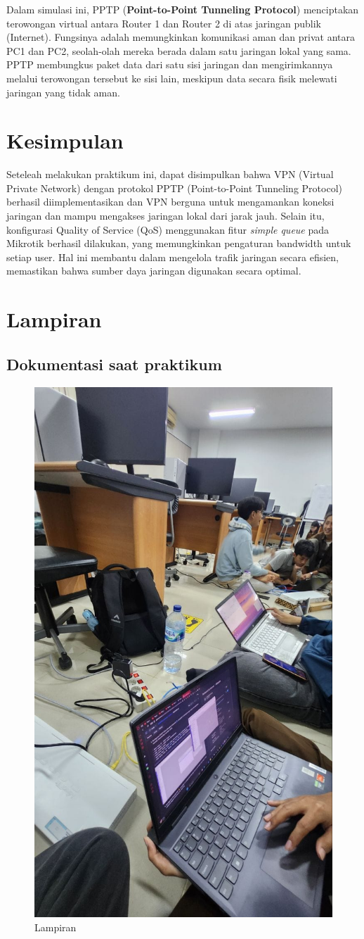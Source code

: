Dalam simulasi ini, PPTP (\textbf{Point-to-Point Tunneling Protocol}) menciptakan terowongan
virtual antara Router 1 dan Router 2 di atas jaringan publik (Internet).
Fungsinya adalah memungkinkan komunikasi aman dan privat antara PC1 dan PC2,
seolah-olah mereka berada dalam satu jaringan lokal yang sama.
PPTP membungkus paket data dari satu sisi jaringan
dan mengirimkannya melalui terowongan tersebut ke sisi lain,
meskipun data secara fisik melewati jaringan yang tidak aman.

\section{Kesimpulan}
Seteleah melakukan praktikum ini, dapat disimpulkan bahwa VPN (Virtual Private Network) dengan protokol PPTP (Point-to-Point Tunneling Protocol) 
berhasil diimplementasikan dan VPN  berguna untuk  mengamankan koneksi jaringan dan mampu mengakses jaringan lokal dari jarak jauh.
Selain itu, konfigurasi Quality of Service (QoS) menggunakan fitur \textit{simple queue} pada Mikrotik berhasil dilakukan, yang memungkinkan
pengaturan bandwidth untuk setiap user. Hal ini membantu dalam mengelola trafik jaringan secara efisien, memastikan bahwa sumber daya jaringan digunakan secara optimal. 

\section{Lampiran}
\subsection{Dokumentasi saat praktikum}

    \begin{figure}[H]
        \centering
        \includegraphics[width=0.5\linewidth]{lampiran.jpeg}
        \caption{Lampiran}
        \label{fig:Lampiran}
    \end{figure}

